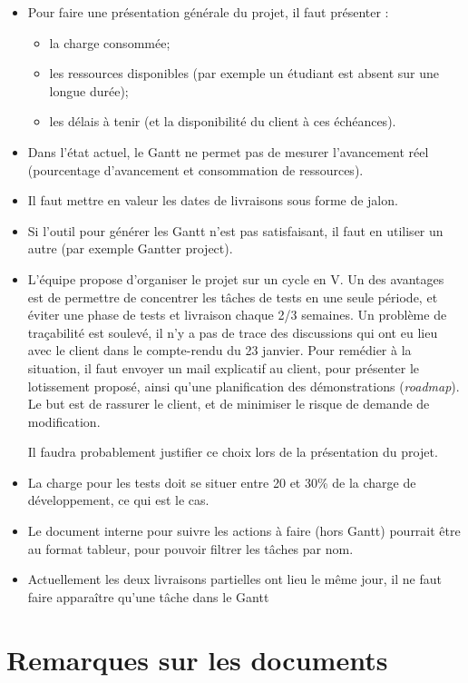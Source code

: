 \documentclass[a4paper,11pt,french]{article}
\begin{document}
\begin{itemize}
\item Pour faire une présentation générale du projet, il faut présenter :
\begin{itemize}
\item la charge consommée;
\item les ressources disponibles (par exemple un étudiant est absent sur une longue durée);
\item les délais à tenir (et la disponibilité du client à ces échéances).
\end{itemize}
\item Dans l'état actuel, le Gantt ne permet pas de mesurer l'avancement réel (pourcentage d'avancement et consommation de ressources).
\item Il faut mettre en valeur les dates de livraisons sous forme de jalon.
\item Si l'outil pour générer les Gantt n'est pas satisfaisant, il faut en utiliser un autre (par exemple Gantter project).
\item L'équipe propose d'organiser le projet sur un cycle en V. Un des avantages est de permettre de concentrer les tâches de tests en une seule période, et éviter une phase de tests et livraison chaque 2/3 semaines.
Un problème de traçabilité est soulevé, il n'y a pas de trace des discussions qui ont eu lieu avec le client dans le compte-rendu du 23 janvier.
Pour remédier à la situation, il faut envoyer un mail explicatif au client, pour présenter le lotissement proposé, ainsi qu'une planification des démonstrations (\textit{roadmap}).
Le but est de rassurer le client, et de minimiser le risque de demande de modification.

Il faudra probablement justifier ce choix lors de la présentation du projet.
\item La charge pour les tests doit se situer entre 20 et 30\% de la charge de développement, ce qui est le cas.
\item  Le document interne pour suivre les actions à faire (hors Gantt) pourrait être au format tableur, pour pouvoir filtrer les tâches par nom.
\item Actuellement les deux livraisons partielles ont lieu le même jour, il ne faut faire apparaître qu'une tâche dans le Gantt
\end{itemize}

\section{Remarques sur les documents}
\end{document}
